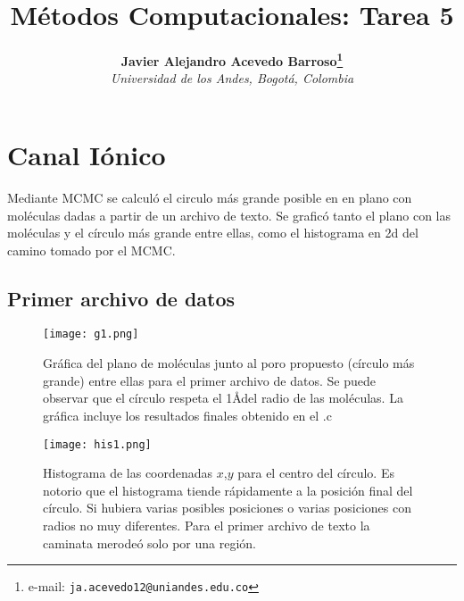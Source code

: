 \documentclass[notitlepage,letterpaper,12pt]{article} %
\begin{document}
\title{Métodos Computacionales: Tarea 5
}
\author{
\textbf{Javier Alejandro Acevedo Barroso\thanks{e-mail: \texttt{ja.acevedo12@uniandes.edu.co}}}\\
\textit{Universidad de los Andes, Bogotá, Colombia}\\
} %

\maketitle %



\section{Canal Iónico}

Mediante MCMC se calculó el circulo más grande posible en en plano con moléculas dadas a partir de un archivo de texto. Se graficó tanto el plano con las moléculas y el círculo más grande entre ellas, como el histograma en 2d del camino tomado por el MCMC.\\


\newpage
\subsection{Primer archivo de datos}
\begin{figure}[h!]
  \centering
   \texttt{[image: g1.png]}
  \caption{Gráfica del plano de moléculas junto al poro propuesto (círculo más grande) entre ellas para el primer archivo de datos. Se puede observar que el círculo respeta el 1\AA  del radio de las moléculas. La gráfica incluye los resultados finales obtenido en el .c}
  \label{g1d1}
\end{figure}
\newpage

\begin{figure}[h!]
  \centering
   \texttt{[image: his1.png]}
  \caption{Histograma de las coordenadas $x$,$y$ para el centro del círculo. Es notorio que el histograma tiende rápidamente a la posición final del círculo. Si hubiera varias posibles posiciones o varias posiciones con radios no muy diferentes. Para el primer archivo de texto la caminata merodeó solo por una región. }
  \label{g2d1}
\end{figure}
\end{document}
